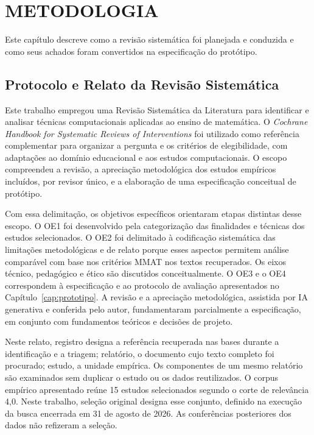 \chapter{METODOLOGIA}
\label{cap:metodologia}

Este capítulo descreve como a revisão sistemática foi planejada e conduzida e como seus achados foram convertidos na especificação do protótipo.

\section{Protocolo e Relato da Revisão Sistemática}
\label{sec:protocolo-relato}

Este trabalho empregou uma Revisão Sistemática da Literatura para identificar e analisar técnicas computacionais aplicadas ao ensino de matemática. O \textit{Cochrane Handbook for Systematic Reviews of Interventions} \cite{CochraneHandbook} foi utilizado como referência complementar para organizar a pergunta e os critérios de elegibilidade, com adaptações ao domínio educacional e aos estudos computacionais. O escopo compreendeu a revisão, a apreciação metodológica dos estudos empíricos incluídos, por revisor único, e a elaboração de uma especificação conceitual de protótipo.

Com essa delimitação, os objetivos específicos orientaram etapas distintas desse escopo. O OE1 foi desenvolvido pela categorização das finalidades e técnicas dos estudos selecionados. O OE2 foi delimitado à codificação sistemática das limitações metodológicas e de relato porque esses aspectos permitem análise comparável com base nos critérios MMAT nos textos recuperados. Os eixos técnico, pedagógico e ético são discutidos conceitualmente. O OE3 e o OE4 correspondem à especificação e ao protocolo de avaliação apresentados no Capítulo~\ref{cap:prototipo}. A revisão e a apreciação metodológica, assistida por IA generativa e conferida pelo autor, fundamentaram parcialmente a especificação, em conjunto com fundamentos teóricos e decisões de projeto.

Neste relato, registro designa a referência recuperada nas bases durante a identificação e a triagem; relatório, o documento cujo texto completo foi procurado; estudo, a unidade empírica. Os componentes de um mesmo relatório são examinados sem duplicar o estudo ou os dados reutilizados. O corpus empírico apresentado reúne 15 estudos selecionados segundo o corte de relevância 4,0. Neste trabalho, seleção original designa esse conjunto, definido na execução da busca encerrada em 31 de agosto de 2026. As conferências posteriores dos dados não refizeram a seleção.

